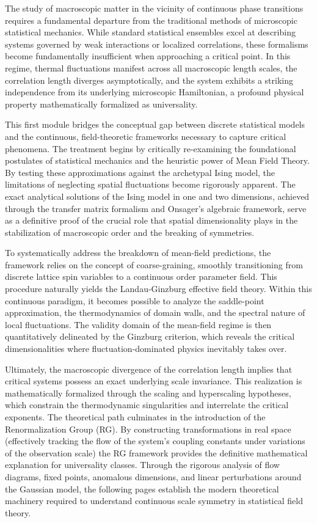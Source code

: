 
The study of macroscopic matter in the vicinity of continuous phase transitions requires a fundamental departure from the traditional methods of microscopic statistical mechanics. While standard statistical ensembles excel at describing systems governed by weak interactions or localized correlations, these formalisms become fundamentally insufficient when approaching a critical point. In this regime, thermal fluctuations manifest across all macroscopic length scales, the correlation length diverges asymptotically, and the system exhibits a striking independence from its underlying microscopic Hamiltonian, a profound physical property mathematically formalized as universality.

This first module bridges the conceptual gap between discrete statistical models and the continuous, field-theoretic frameworks necessary to capture critical phenomena. The treatment begins by critically re-examining the foundational postulates of statistical mechanics and the heuristic power of Mean Field Theory. By testing these approximations against the archetypal Ising model, the limitations of neglecting spatial fluctuations become rigorously apparent. The exact analytical solutions of the Ising model in one and two dimensions, achieved through the transfer matrix formalism and Onsager's algebraic framework, serve as a definitive proof of the crucial role that spatial dimensionality plays in the stabilization of macroscopic order and the breaking of symmetries.

To systematically address the breakdown of mean-field predictions, the framework relies on the concept of coarse-graining, smoothly transitioning from discrete lattice spin variables to a continuous order parameter field. This procedure naturally yields the Landau-Ginzburg effective field theory. Within this continuous paradigm, it becomes possible to analyze the saddle-point approximation, the thermodynamics of domain walls, and the spectral nature of local fluctuations. The validity domain of the mean-field regime is then quantitatively delineated by the Ginzburg criterion, which reveals the critical dimensionalities where fluctuation-dominated physics inevitably takes over.

Ultimately, the macroscopic divergence of the correlation length implies that critical systems possess an exact underlying scale invariance. This realization is mathematically formalized through the scaling and hyperscaling hypotheses, which constrain the thermodynamic singularities and interrelate the critical exponents. The theoretical path culminates in the introduction of the Renormalization Group (RG). By constructing transformations in real space (effectively tracking the flow of the system's coupling constants under variations of the observation scale) the RG framework provides the definitive mathematical explanation for universality classes. Through the rigorous analysis of flow diagrams, fixed points, anomalous dimensions, and linear perturbations around the Gaussian model, the following pages establish the modern theoretical machinery required to understand continuous scale symmetry in statistical field theory.